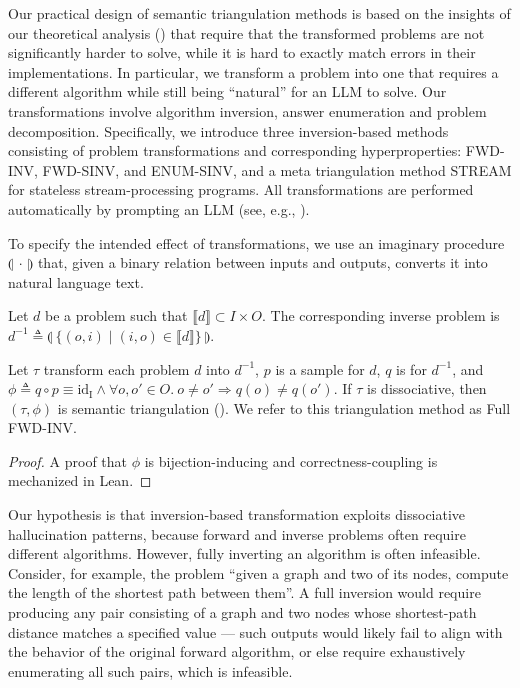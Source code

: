 \documentclass[acmsmall,screen,nonacm]{acmart}
\begin{document}
Our practical design of semantic triangulation methods is based on the insights of our theoretical analysis () that require that the transformed problems are not significantly harder to solve, while it is hard to exactly match errors in their implementations. In particular, we transform a problem into one that requires a different algorithm while still being ``natural'' for an LLM to solve. Our transformations involve algorithm inversion, answer enumeration and problem decomposition. Specifically, we introduce three inversion-based methods consisting of problem transformations and corresponding hyperproperties: FWD-INV, FWD-SINV, and ENUM-SINV, and a meta triangulation method STREAM for stateless stream-processing programs. All transformations are performed automatically by prompting an LLM (see, e.g., ).

To specify the intended effect of transformations, we use an imaginary procedure $\llparenthesis\ \cdot\ \rrparenthesis$ that, given a binary relation between inputs and outputs, converts it into natural language text.

\begin{definition}
  Let $d$ be a problem such that $\llbracket d \rrbracket\subset I\times O$. The corresponding inverse problem is $d^{-1} \triangleq \llparenthesis\ \{(o, i) \mid (i, o) \in \llbracket d \rrbracket\}\ \rrparenthesis.$
\end{definition}

\begin{proposition}
  Let $\tau$ transform each problem $d$ into $d^{-1}$, $p$ is a sample for $d$, $q$ is for $d^{-1}$, and $\phi\triangleq q \circ p \equiv \mathrm{id_I} \wedge \forall o, o'\in O.\ o \neq o' \Rightarrow q(o) \neq q(o')$. If $\tau$ is dissociative, then $(\tau, \phi)$ is semantic triangulation (). We refer to this triangulation method as Full FWD-INV.
\end{proposition}

\begin{proof}
  A proof that $\phi$ is bijection-inducing and correctness-coupling is mechanized in Lean.
\end{proof}

Our hypothesis is that inversion-based transformation exploits dissociative hallucination patterns, because forward and inverse problems often require different algorithms. However, fully inverting an algorithm is often infeasible. Consider, for example, the problem ``given a graph and two of its nodes, compute the length of the shortest path between them''. A full inversion would require producing any pair consisting of a graph and two nodes whose shortest-path distance matches a specified value --- such outputs would likely fail to align with the behavior of the original forward algorithm, or else require exhaustively enumerating all such pairs, which is infeasible.
\end{document}
